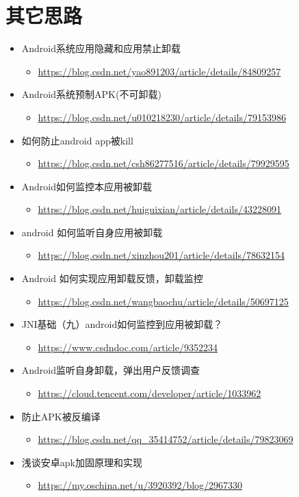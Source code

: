\documentclass[9pt, b5paper]{article}
\begin{document}
\section{其它思路}
\label{sec-7}
\begin{itemize}
\item Android系统应用隐藏和应用禁止卸载
\begin{itemize}
\item \url{https://blog.csdn.net/yao891203/article/details/84809257}
\end{itemize}
\item Android系统预制APK(不可卸载)
\begin{itemize}
\item \url{https://blog.csdn.net/u010218230/article/details/79153986}
\end{itemize}
\item 如何防止android app被kill
\begin{itemize}
\item \url{https://blog.csdn.net/csh86277516/article/details/79929595}
\end{itemize}
\item Android如何监控本应用被卸载
\begin{itemize}
\item \url{https://blog.csdn.net/huiguixian/article/details/43228091}
\end{itemize}
\item android 如何监听自身应用被卸载
\begin{itemize}
\item \url{https://blog.csdn.net/xinzhou201/article/details/78632154}
\end{itemize}
\item Android 如何实现应用卸载反馈，卸载监控
\begin{itemize}
\item \url{https://blog.csdn.net/wangbaochu/article/details/50697125}
\end{itemize}
\item JNI基础（九）android如何监控到应用被卸载？
\begin{itemize}
\item \url{https://www.csdndoc.com/article/9352234}
\end{itemize}
\item Android监听自身卸载，弹出用户反馈调查
\begin{itemize}
\item \url{https://cloud.tencent.com/developer/article/1033962}
\end{itemize}
\item 防止APK被反编译
\begin{itemize}
\item \url{https://blog.csdn.net/qq_35414752/article/details/79823069}
\end{itemize}
\item 浅谈安卓apk加固原理和实现
\begin{itemize}
\item \url{https://my.oschina.net/u/3920392/blog/2967330}
\end{itemize}
\end{itemize}
\end{document}
